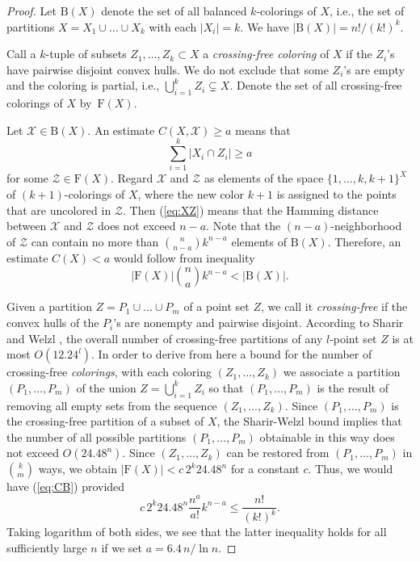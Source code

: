 \documentclass[reqno,12pt]{amsart}
\newcommand{\refeq}[1]{(\ref{eq:#1})}
\newcommand{\colX}{{\mathcal X}}
\newcommand{\colZ}{{\mathcal Z}}
\newcommand{\cspace}{{\mathrm F}(X)}
\newcommand{\bspace}{{\mathrm B}(X)}
\begin{document}
\begin{proof}
Let $\bspace$ denote the set of all balanced $k$-colorings of $X$, i.e.,
the set of partitions $X=X_1\cup\ldots\cup X_k$ with each $|X_i|=k$.
We have $|\bspace|=n!/(k!)^k$.

Call a $k$-tuple of subsets $Z_1,\ldots,Z_k\subset X$ a \emph{crossing-free
coloring} of $X$ if the $Z_i$'s have pairwise disjoint convex hulls.
We do not exclude that some $Z_i$'s are empty and the coloring is partial, i.e.,
$\bigcup_{i=1}^kZ_i\subsetneq X$. Denote the set of all crossing-free colorings of $X$
by~$\cspace$.

Let $\colX\in\bspace$. An estimate $C(X,\colX)\ge a$ means that
\begin{equation}\label{eq:XZ}
\sum_{i=1}^k|X_i\cap Z_i|\ge a
\end{equation}
for some $\colZ\in\cspace$. Regard $\colX$ and $\colZ$ as elements of the space
$\{1,\ldots,k,k+1\}^X$ of $(k+1)$-colorings of $X$, where the new color $k+1$ is
assigned to the points that are uncolored in $\colZ$. Then \refeq{XZ} means
that the Hamming distance between $\colX$ and $\colZ$ does not exceed $n-a$.
Note that the $(n-a)$-neighborhood of $\colZ$ can contain no more than 
${n\choose n-a}k^{n-a}$ elements of $\bspace$. Therefore, an estimate $C(X)<a$
would follow from inequality
\begin{equation}\label{eq:CB}
|\cspace|{n\choose a}k^{n-a} < |\bspace|.
\end{equation}

Given a partition $Z=P_1\cup\ldots\cup P_m$ of a point set $Z$,
we call it \emph{crossing-free} if the
convex hulls of the $P_i$'s are nonempty and pairwise disjoint. 
According to Sharir and Welzl \cite[Theorem 5.2]{ShW},
the overall number of crossing-free partitions of any $l$-point set
$Z$ is at most $O(12.24^l)$.
In order to derive from here a bound for the number of
crossing-free \emph{colorings}, with each coloring $(Z_1,\ldots,Z_k)$
we associate a partition $(P_1,\ldots,P_m)$ of the union $Z=\bigcup_{i=1}^kZ_i$
so that $(P_1,\ldots,P_m)$
is the result of removing all empty sets from the sequence $(Z_1,\ldots,Z_k)$.
Since $(P_1,\ldots,P_m)$ is the crossing-free partition of a subset of $X$,
the Sharir-Welzl bound implies that the number of all possible partitions $(P_1,\ldots,P_m)$
obtainable in this way does not exceed $O(24.48^n)$.
Since $(Z_1,\ldots,Z_k)$ can be restored from $(P_1,\ldots,P_m)$ in
${k\choose m}$ ways, we obtain
$|\cspace| < c\, 2^k 24.48^n$
for a constant $c$. Thus, we would have \refeq{CB} provided
$$
c\, 2^k 24.48^n\frac{n^a}{a!}k^{n-a} \le \frac{n!}{(k!)^k}.
$$
Taking logarithm of both sides, we see that the latter inequality
holds for all sufficiently large $n$ if we set $a=6.4\,n/\ln n$.
\end{proof}
\end{document}
